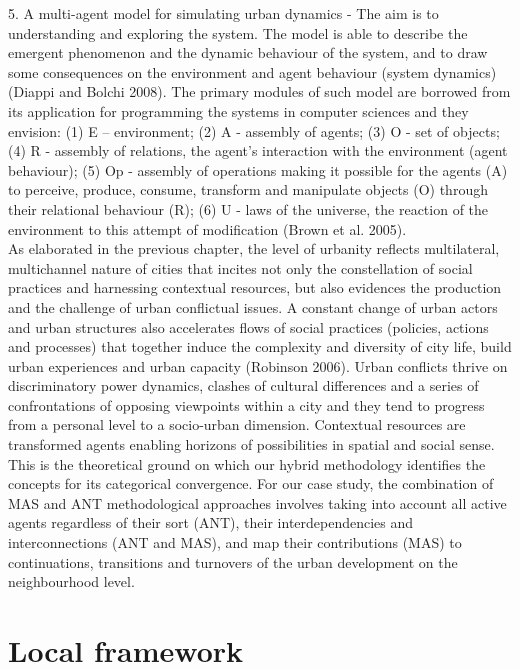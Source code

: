\documentclass[11pt]{report}
\begin{document}
5.	A multi-agent model for simulating urban dynamics - The aim is to understanding and exploring the system. The model is able to describe the emergent phenomenon and the dynamic behaviour of the system,  and to draw some consequences on the environment and agent behaviour (system dynamics) (Diappi and Bolchi 2008). The primary modules of such model are borrowed from its application for programming the systems in computer sciences and they envision: (1) E – environment; (2)  A - assembly of agents; (3) O - set of objects; (4) R - assembly of relations, the agent’s interaction with the environment (agent behaviour); (5) Op - assembly of operations making it possible for the agents (A) to perceive, produce, consume, transform and manipulate objects (O) through their relational behaviour (R); (6) U - laws of the universe, the reaction  of  the  environment  to  this  attempt  of  modification (Brown et al. 2005).
\\ 
As elaborated in the previous chapter, the level of urbanity reflects multilateral, multichannel  nature of cities that incites not only the constellation of social practices and harnessing contextual resources, but also evidences the production and the challenge of urban conflictual issues. A constant change of urban actors and urban structures also accelerates flows of social practices (policies, actions and processes) that together induce the complexity and diversity of city life, build urban experiences and urban capacity (Robinson 2006). Urban conflicts thrive on discriminatory power dynamics, clashes of cultural differences and a series of confrontations of opposing viewpoints within a city and they tend to progress from a personal level to a socio-urban dimension. Contextual resources are transformed agents enabling horizons of possibilities in spatial and social sense.
\\
This is the theoretical ground on which our hybrid methodology identifies the concepts for its categorical convergence. For our case study, the combination of MAS and ANT methodological approaches involves taking into account all active agents regardless of their sort (ANT), their interdependencies and interconnections (ANT and MAS), and map their contributions (MAS) to continuations, transitions and turnovers of the urban development on the neighbourhood level.

\section{Local framework}
\end{document}
